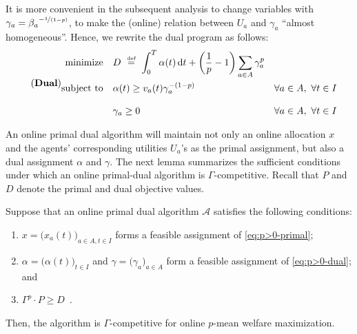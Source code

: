 \documentclass[11pt,letterpaper]{article}
\newcommand{\A}{\mathcal{A}}
\newcommand{\dif}[1]{\,\text{\rm d} #1}
\newcommand{\utility}{U}
\newcommand{\defeq}{\stackrel{\textrm{\tiny def}}{=}}
\begin{document}
It is more convenient in the subsequent analysis to change variables with $\gamma_a = {\beta_a}^{- \nicefrac{1}{(1-p)}}$, to make the (online) relation between $\utility_a$ and $\gamma_a$ ``almost homogeneous''.
Hence, we rewrite the dual program as follows:
\begin{equation}
\tag{\text{\rm\bf Dual}}
\label{eq:p>0-dual}
\begin{aligned}
	\text{minimize} \quad & 
	D ~\defeq~ \int_0^T \alpha(t) \dif{t} + \left( \frac{1}{p} - 1 \right) \sum_{a\in A} \gamma_a^{p}  \\
	\text{subject to} \quad & \alpha(t) \geq v_{a}(t) \gamma_a^{-(1-p)} && \forall a \in A, ~\forall t \in I \\[2ex]
	& \gamma_a \geq 0 && \forall a \in A, ~\forall t \in I
\end{aligned}
\end{equation}

An online primal dual algorithm will maintain not only an online allocation $x$ and the agents' corresponding utilities $\utility_a$'s as the primal assignment, but also a dual assignment $\alpha$ and $\gamma$.
The next lemma summarizes the sufficient conditions under which an online primal-dual algorithm is $\Gamma$-competitive.
Recall that $P$ and $D$ denote the primal and dual objective values.

\begin{lemma}
	\label{lem:p>0-primal-dual}
	Suppose that an online primal dual algorithm $\A$ satisfies the following conditions:
	\begin{enumerate}[label=(\alph*)]
		\item $x = \big( x_a(t) \big)_{a \in A, t \in I}$ forms a feasible assignment of \ref{eq:p>0-primal}; \label{cond:p>0-primal-feasibility}
		\item $\alpha = \big( \alpha(t) \big)_{t \in I}$ and $\gamma = \big( \gamma_a \big)_{a \in A}$ form a feasible assignment of \ref{eq:p>0-dual}; and \label{cond:p>0-dual-feasibility}
		\item $\Gamma^p \cdot P \geq D$~. \label{cond:p>0-ratio}
	\end{enumerate}
	Then, the algorithm is $\Gamma$-competitive for online $p$-mean welfare maximization.
\end{lemma}
\end{document}
